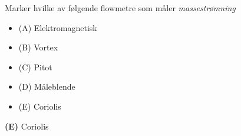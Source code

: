 


Marker hvilke av følgende flowmetre som måler {\it massestrømning}

\begin{itemize}
\item{(A)} Elektromagnetisk
\vskip 5pt 
\item{(B)} Vortex
\vskip 5pt 
\item{(C)} Pitot
\vskip 5pt 
\item{(D)} Måleblende
\vskip 5pt 
\item{(E)} Coriolis
\end{itemize}







{\bf (E)} Coriolis
 









